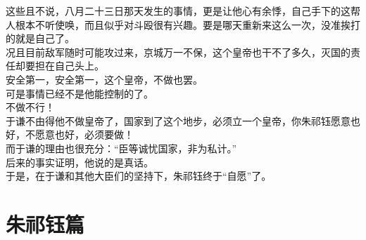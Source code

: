 \begin{multicols}{\theparacolNo}
这些且不说，八月二十三日那天发生的事情，更是让他心有余悸，自己手下的这帮人根本不听使唤，而且似乎对斗殴很有兴趣。要是哪天重新来这么一次，没准挨打的就是自己了。\\

况且目前敌军随时可能攻过来，京城万一不保，这个皇帝也干不了多久，灭国的责任却要担在自己头上。\\

安全第一，安全第一，这个皇帝，不做也罢。\\

可是事情已经不是他能控制的了。\\

不做不行！\\

于谦不由得他不做皇帝了，国家到了这个地步，必须立一个皇帝，你朱祁钰愿意也好，不愿意也好，必须要做！\\

而于谦的理由也很充分：“臣等诚忧国家，非为私计。”\\

后来的事实证明，他说的是真话。\\

于是，在于谦和其他大臣们的坚持下，朱祁钰终于“自愿”了。\\
\ifnum{}
	\end{multicols}
\fi
\newpage
\chapter*{朱祁钰篇}
